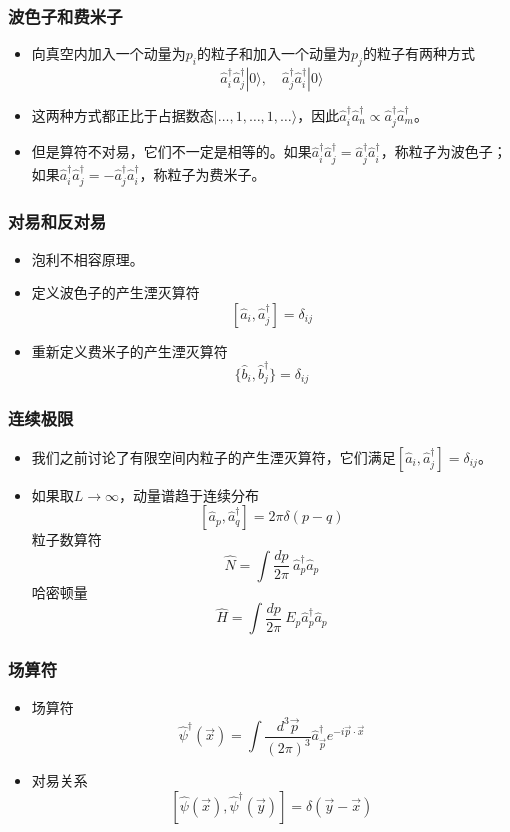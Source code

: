 \documentclass[aspectratio=1610,14pt,mathserif]{beamer}
\newcommand{\bch}{}
\newcommand{\ech}{}
\begin{document}
\begin{frame}
\frametitle{\bch 波色子和费米子 \ech}
\bch
\begin{itemize}
\item 向真空内加入一个动量为$p_i$的粒子和加入一个动量为$p_j$的粒子有两种方式
$$
\hat{a}_i^\dagger \hat{a}_j^\dagger |0\rangle ,\quad \hat{a}_j^\dagger \hat{a}_i^\dagger |0\rangle 
$$
\item 这两种方式都正比于占据数态$|\dots,1,\dots,1,\dots\rangle$，因此$\hat{a}_i^\dagger \hat{a}_n^\dagger \propto\hat{a}_j^\dagger \hat{a}_m^\dagger$。
\item 但是算符不对易，它们不一定是相等的。如果$\hat{a}_i^\dagger \hat{a}_j^\dagger = \hat{a}_j^\dagger \hat{a}_i^\dagger$，称粒子为波色子；如果$\hat{a}_i^\dagger \hat{a}_j^\dagger = -\hat{a}_j^\dagger \hat{a}_i^\dagger$，称粒子为费米子。
\end{itemize}
\ech
\end{frame}

\begin{frame}
\frametitle{\bch 对易和反对易 \ech}
\bch
\begin{itemize}
\item
泡利不相容原理。
\item 定义波色子的产生湮灭算符
$$
[\hat{a}_i,\hat{a}_j^\dagger] = \delta_{ij}
$$
\item 重新定义费米子的产生湮灭算符
$$
\{\hat{b}_i,\hat{b}_j^\dagger\} = \delta_{ij}
$$
\end{itemize}
\ech
\end{frame}

\begin{frame}
\frametitle{\bch 连续极限 \ech}
\bch
\begin{itemize}
\item 我们之前讨论了有限空间内粒子的产生湮灭算符，它们满足$[\hat{a}_i,\hat{a}_j^\dagger] = \delta_{ij}$。
\item 如果取$L\to \infty$，动量谱趋于连续分布
$$
[\hat{a}_p,\hat{a}_q^\dagger] =2\pi \delta(p-q)
$$
粒子数算符
$$
\hat N = \int \frac{dp}{2\pi}\ \hat{a}^\dagger_p \hat{a}_p
$$
哈密顿量
$$
\hat H = \int \frac{dp}{2\pi}\ E_p\hat{a}^\dagger_p \hat{a}_p
$$
\end{itemize}
\ech
\end{frame}

\begin{frame}
\frametitle{\bch 场算符 \ech}
\bch
\begin{itemize}
\item 场算符
$$
\hat \psi^\dagger(\vec x) = \int \frac{d^3 \vec p}{(2\pi)^3} \hat a^\dagger_{\vec p} e^{-i\vec p \cdot \vec x}
$$
\item
对易关系
$$
[\hat \psi(\vec x) ,\hat \psi^\dagger(\vec y) ] = \delta(\vec y - \vec x)
$$
\end{itemize}
\ech
\end{frame}
\end{document}
